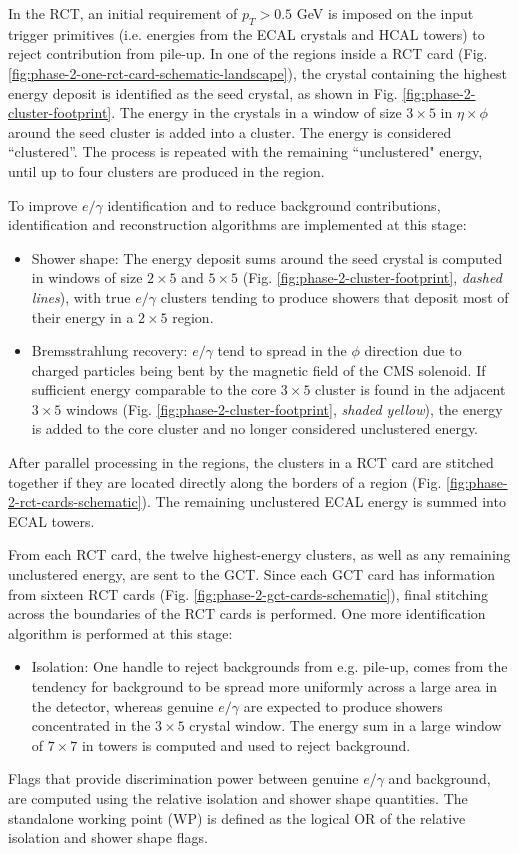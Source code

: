 In the RCT, an initial requirement of $p_{T} > 0.5$ GeV is imposed on the input trigger primitives (i.e. energies from the ECAL crystals and HCAL towers) to reject contribution from pile-up. In one of the regions inside a RCT card (Fig. \ref{fig:phase-2-one-rct-card-schematic-landscape}), the crystal containing the highest energy deposit is identified as the seed crystal, as shown in Fig. \ref{fig:phase-2-cluster-footprint}. The energy in the crystals in a window of size $3\times 5$ in $\eta\times\phi$ around the seed cluster is added into a cluster. The energy is considered ``clustered''. The process is repeated with the remaining ``unclustered" energy, until up to four clusters are produced in the region. 

To improve $e/\gamma$ identification and to reduce background contributions, identification and reconstruction algorithms are implemented at this stage:
\begin{itemize}
    \item Shower shape: The energy deposit sums around the seed crystal is computed in windows of size $2 \times 5$ and $5 \times 5$ (Fig. \ref{fig:phase-2-cluster-footprint}, \textit{dashed lines}), with true $e/\gamma$ clusters tending to produce showers that deposit most of their energy in a $2 \times 5$ region. 
    \item Bremsstrahlung recovery: $e/\gamma$ tend to spread in the $\phi$ direction due to charged particles being bent by the magnetic field of the CMS solenoid. If sufficient energy comparable to the core $3 \times 5$ cluster is found in the adjacent $3 \times 5$ windows (Fig. \ref{fig:phase-2-cluster-footprint}, \textit{shaded yellow}), the energy is added to the core cluster and no longer considered unclustered energy.
\end{itemize}

After parallel processing in the regions, the clusters in a RCT card are stitched together if they are located directly along the borders of a region (Fig. \ref{fig:phase-2-rct-cards-schematic}). The remaining unclustered ECAL energy is summed into ECAL towers. 

From each RCT card, the twelve highest-energy clusters, as well as any remaining unclustered energy, are sent to the GCT. Since each GCT card has information from sixteen RCT cards (Fig. \ref{fig:phase-2-gct-cards-schematic}), final stitching across the boundaries of the RCT cards is performed. One more identification algorithm is performed at this stage:
\begin{itemize}
    \item Isolation: One handle to reject backgrounds from e.g. pile-up, comes from the tendency for background to be spread more uniformly across a large area in the detector, whereas genuine $e/\gamma$ are expected to produce showers concentrated in the $3 \times 5$ crystal window. The energy sum in a large window of $7 \times 7$ in towers is computed and used to reject background.
\end{itemize}
Flags that provide discrimination power between genuine $e/\gamma$ and background, are computed using the relative isolation and shower shape quantities. The standalone working point (WP) is defined as the logical OR of the relative isolation and shower shape flags. 

